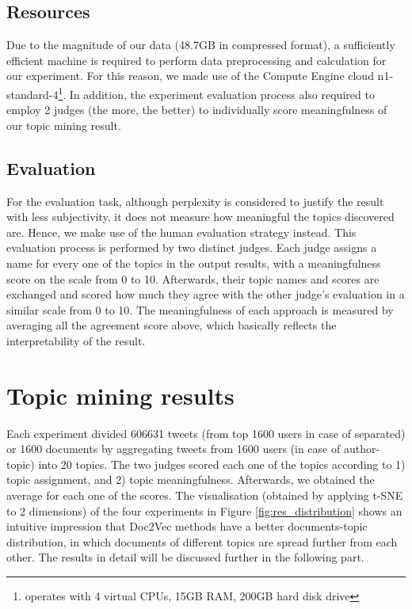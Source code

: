 \documentclass[11pt]{article}
\begin{document}
\subsection{Resources} \label{resources}

Due to the magnitude of our data (48.7GB in compressed format), a sufficiently efficient machine is required to perform data preprocessing and calculation for our experiment. For this reason, we made use of the Compute Engine cloud n1-standard-4\footnote{operates with 4 virtual CPUs, 15GB RAM, 200GB hard disk drive}. In addition, the experiment evaluation process also required to employ 2 judges (the more, the better) to individually score meaningfulness of our topic mining result.

\subsection{Evaluation}

For the evaluation task, although perplexity is considered to justify the result with less subjectivity, it does not measure how meaningful the topics discovered are. Hence, we make use of the human evaluation strategy\cite{zhao2011comparing} instead. This evaluation process is performed by two distinct judges. Each judge assigns a name for every one of the topics in the output results, with a meaningfulness score on the scale from 0 to 10. Afterwards, their topic names and scores are exchanged and scored how much they agree with the other judge's evaluation in a similar scale from 0 to 10. The meaningfulness of each approach is measured by averaging all the agreement score above, which basically reflects the interpretability of the result.

\section{Topic mining results}
Each experiment divided 606631 tweets (from top 1600 users in case of separated) or 1600 documents by aggregating tweets from 1600 users (in case of author-topic) into 20 topics. The two judges scored each one of the topics according to 1) topic assignment, and 2) topic meaningfulness. Afterwards, we obtained the average for each one of the scores. The visualisation (obtained by applying t-SNE to 2 dimensions) of the four experiments in Figure \ref{fig:res_distribution} shows an intuitive impression that Doc2Vec methods have a better documents-topic distribution, in which documents of different topics are spread further from each other. The results in detail will be discussed further in the following part.
\end{document}
